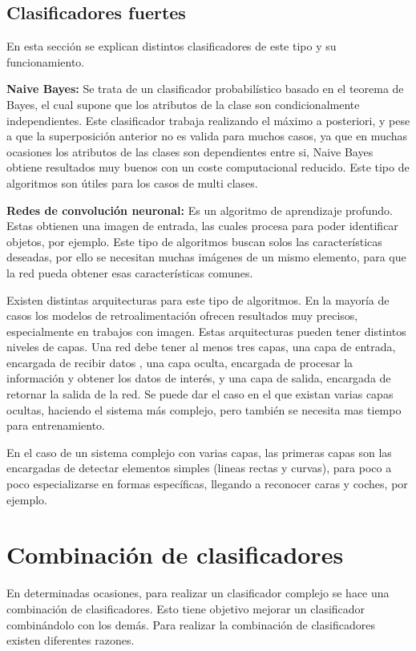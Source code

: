 \subsection{Clasificadores fuertes}
En esta sección se explican distintos clasificadores de este tipo y su funcionamiento.

\textbf{Naive Bayes:} Se trata de un clasificador probabilístico basado en el teorema de Bayes, el cual supone que los atributos de la clase son condicionalmente independientes. Este clasificador trabaja realizando el máximo a posteriori, y pese a que la superposición anterior no es valida para muchos casos, ya que en muchas ocasiones los atributos de las clases son dependientes entre si, Naive Bayes obtiene resultados muy buenos con un coste computacional reducido.
Este tipo de algoritmos son útiles para los casos de multi clases. 


\textbf{Redes de convolución neuronal:} Es un algoritmo de aprendizaje profundo. Estas obtienen una imagen de entrada, las cuales procesa para poder identificar objetos, por ejemplo. Este tipo de algoritmos buscan solos las características deseadas, por ello se necesitan muchas imágenes de un mismo elemento, para que la red pueda obtener esas características comunes.

Existen distintas arquitecturas para este tipo de algoritmos. En la mayoría de casos los modelos de retroalimentación ofrecen resultados muy precisos, especialmente en trabajos con imagen.
Estas arquitecturas pueden tener distintos niveles de capas. Una red debe tener al menos tres capas, una capa de entrada, encargada de recibir datos , una capa oculta, encargada de procesar la información y obtener los datos de interés, y una capa de salida, encargada de retornar la salida de la red. Se puede dar el caso en el que existan varias capas ocultas, haciendo el sistema más complejo, pero también se necesita mas tiempo para entrenamiento. 

En el caso de un sistema complejo con varias capas, las primeras capas son las encargadas de detectar elementos simples (lineas rectas y curvas), para poco a poco especializarse en formas específicas, llegando a reconocer caras y coches, por ejemplo.


\section{Combinación de clasificadores}
En determinadas ocasiones, para realizar un clasificador complejo se hace una combinación de clasificadores. Esto tiene objetivo mejorar un clasificador combinándolo con los demás.
Para realizar la combinación de clasificadores existen diferentes razones. 

